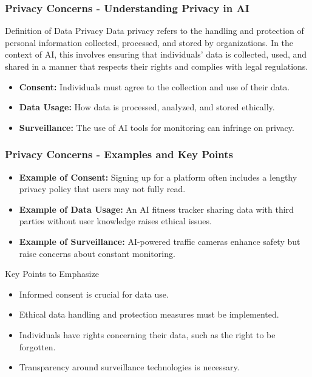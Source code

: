 \documentclass[aspectratio=169]{beamer}
\begin{document}
\begin{frame}[fragile]
    \frametitle{Privacy Concerns - Understanding Privacy in AI}
    
    \begin{block}{Definition of Data Privacy}
        Data privacy refers to the handling and protection of personal information collected, processed, and stored by organizations. In the context of AI, this involves ensuring that individuals' data is collected, used, and shared in a manner that respects their rights and complies with legal regulations.
    \end{block}
    
    \begin{itemize}
        \item \textbf{Consent:} Individuals must agree to the collection and use of their data.
        \item \textbf{Data Usage:} How data is processed, analyzed, and stored ethically.
        \item \textbf{Surveillance:} The use of AI tools for monitoring can infringe on privacy.
    \end{itemize}
\end{frame}

\begin{frame}[fragile]
    \frametitle{Privacy Concerns - Examples and Key Points}
    
    \begin{itemize}
        \item \textbf{Example of Consent:} Signing up for a platform often includes a lengthy privacy policy that users may not fully read.
        \item \textbf{Example of Data Usage:} An AI fitness tracker sharing data with third parties without user knowledge raises ethical issues.
        \item \textbf{Example of Surveillance:} AI-powered traffic cameras enhance safety but raise concerns about constant monitoring.
    \end{itemize}
    
    \begin{block}{Key Points to Emphasize}
        \begin{itemize}
            \item Informed consent is crucial for data use.
            \item Ethical data handling and protection measures must be implemented.
            \item Individuals have rights concerning their data, such as the right to be forgotten.
            \item Transparency around surveillance technologies is necessary.
        \end{itemize}
    \end{block}
\end{frame}
\end{document}
